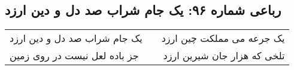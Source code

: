 \begin{center}
\section*{رباعی شماره ۹۶: یک جام شراب صد دل و دین ارزد}
\label{sec:sh096}
\begin{longtable}{l p{0.5cm} r}
یک جام شراب صد دل و دین ارزد
&&
یک جرعه می مملکت چین ارزد
\\
جز باده لعل نیست در روی زمین
&&
تلخی که هزار جان شیرین ارزد
\\
\end{longtable}
\end{center}
